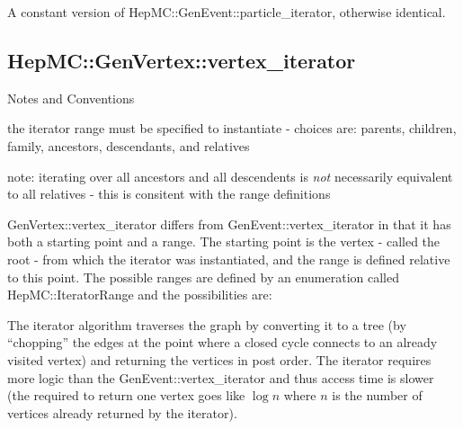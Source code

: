 \documentclass[11pt,letterpaper]{article}
\begin{document}
A constant version of HepMC::GenEvent::particle\_iterator, otherwise
identical.

%
%

\subsection{HepMC::GenVertex::vertex\_iterator}
\begin{myitemize}{Notes and Conventions}
  \item the iterator range must be specified to instantiate -
    choices are: parents, children, family, ancestors, descendants,
    and relatives
  \item note: iterating over all ancestors and all descendents is {\it
      not} necessarily equivalent to all relatives - this is consitent
    with the range definitions
\end{myitemize}

GenVertex::vertex\_iterator differs from GenEvent::vertex\_iterator
in that it has both a starting point and a range. The starting point
is the vertex - called the root - from which the iterator was
instantiated, and the range is defined relative to this point.
The possible ranges are defined by an enumeration called
HepMC::IteratorRange and the possibilities are:
\begin{itemize}\setlength{\itemsep}{0pt}
\end{itemize}

The iterator algorithm traverses the graph by converting it to a tree
(by ``chopping'' the edges at the point where a closed cycle connects
to an already visited vertex) and returning the vertices in post
order. The iterator requires more logic than the
GenEvent::vertex\_iterator and thus access time is slower (the
required to return one vertex goes like $\log n$ where $n$ is the
number of vertices already returned by the iterator).
\end{document}
